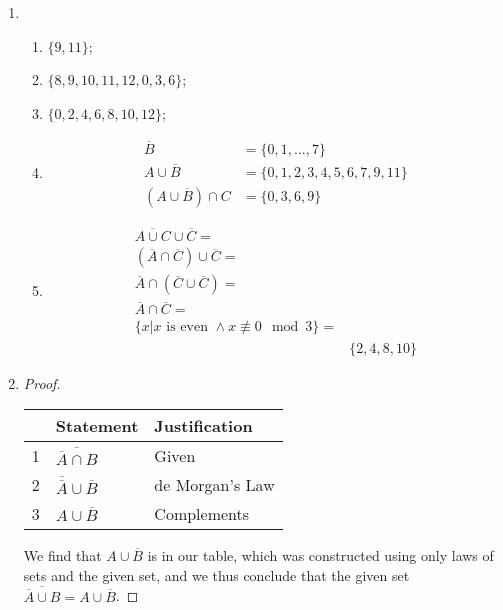 \documentclass{article}
\begin{document}
\begin{enumerate}
    \item 
        \begin{enumerate}
            \item $\{9,11\}$;
            \item $\{8, 9, 10, 11, 12, 0, 3, 6\}$;
            \item $\{0, 2,4,6,8,10,12\}$;
            \item 
                \begin{align*}
                    \overline{B} &= \{0, 1, ..., 7\} \\
                    A \cup \overline{B} &= \{0,1,2,3,4,5,6,7,9,11\} \\
                    (A \cup \overline{B}) \cap C &= \{0, 3,6,9\}
                \end{align*}
            \item 
                \begin{align*}
                    \overline{A \cup C} \cup \overline{C} = \\
                    (\overline{A} \cap \overline{C}) \cup \overline{C} = \\
                    \overline{A} \cap (\overline{C} \cup \overline{C}) = \\
                    \overline{A} \cap \overline{C} = \\
                    \{x | x \text{ is even } \land x \not\equiv 0 \mod{3}\} = \\
                    &\{2,4,8,10\}
                \end{align*}
        \end{enumerate}
        
    \item 
        \begin{proof}

        \begin{tabular}{l | l | l}
            & Statement & Justification \\ \hline
            1 & $ \overline{\overline{A} \cap B}$ & Given \\
            2 & $ \overline{\overline{A}} \cup \overline{B}$ & de Morgan's Law \\
            3 & $ A \cup \overline{B} $ & Complements \\
        \end{tabular}

        We find that $A \cup \overline{B} $ is in our table, which was constructed using only laws of sets and the given set, and we thus conclude that the given set $\overline{\overline{A} \cup B} = A \cup \overline{B}$.
    \end{proof}
        

\end{enumerate}
\end{document}
